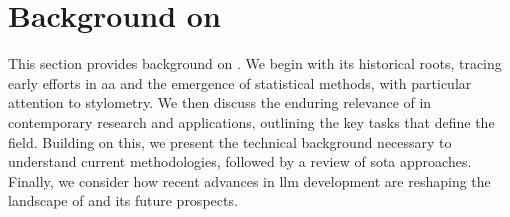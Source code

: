 \chapter{Background on \ai{}}
\label{chap:authorship_identification}

This section provides background on \ai{}. 
We begin with its historical roots, tracing early efforts in \ac{aa} and the emergence of statistical methods, with particular attention to stylometry. 
We then discuss the enduring relevance of \ai{} in contemporary research and applications, outlining the key tasks that define the field. 
Building on this, we present the technical background necessary to understand current methodologies, followed by a review of \acl{sota} approaches. 
Finally, we consider how recent advances in \ac{llm} development are reshaping the landscape of \ai{} and its future prospects.










% 



